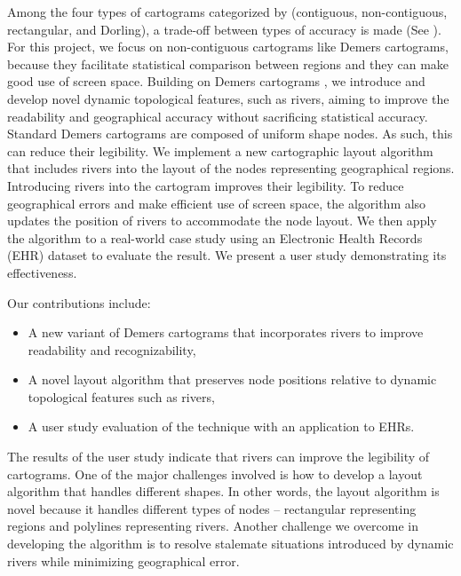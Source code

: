 Among the four types of cartograms categorized by  (contiguous, non-contiguous, rectangular, and Dorling), a trade-off between types of accuracy is made (See ). For this project, we focus on non-contiguous cartograms like Demers cartograms, because they facilitate statistical comparison between regions and they can make good use of screen space. Building on Demers cartograms \cite{ian2002Cartogram}, we introduce and develop novel dynamic topological features, such as rivers, aiming to improve the readability and geographical accuracy without sacrificing statistical accuracy. Standard Demers cartograms are composed of uniform shape nodes. As such, this can reduce their legibility. We implement a new cartographic layout algorithm that includes rivers into the layout of the nodes representing geographical regions. Introducing rivers into the cartogram improves their legibility. To reduce geographical errors and make efficient use of screen space, the algorithm also updates the position of rivers to accommodate the node layout. We then apply the algorithm to a real-world case study using an Electronic Health Records (EHR) dataset to evaluate the result. We present a user study demonstrating its effectiveness.

Our contributions include:

\begin{itemize}
    \item A new variant of Demers cartograms that incorporates rivers to improve readability and recognizability,
    \item A novel layout algorithm that preserves node positions relative to dynamic topological features such as rivers,
    \item A user study evaluation of the technique with an application to EHRs.
\end{itemize}

The results of the user study indicate that rivers can improve the legibility of cartograms. One of the major challenges involved is how to develop a layout algorithm that handles different shapes. In other words, the layout algorithm is novel because it handles different types of nodes -- rectangular representing regions and polylines representing rivers. Another challenge we overcome in developing the algorithm is to resolve stalemate situations introduced by dynamic rivers while minimizing geographical error.